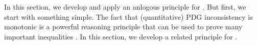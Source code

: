 \begin{subappendices}
{In this section, we develop and apply an anlogous principle for \scibility.
But first, we start with something simple.
}
The fact that (quantitative) PDG inconsistency  is monotonic
is a powerful reasoning principle that can be used to prove many important inequalities \citep{one-true-loss}. 
In this section, we develop a related principle for \scibility.
%
%
%
%
%
%

\end{subappendices}
